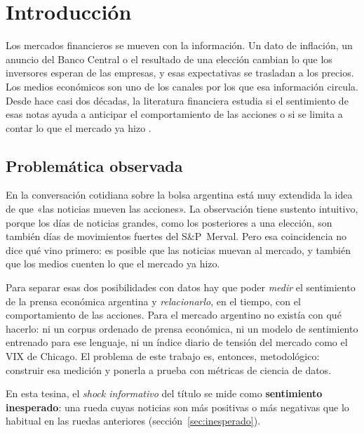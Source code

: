 \chapter{Introducción}
\label{cap:introduccion}

Los mercados financieros se mueven con la información. Un dato de inflación, un anuncio del
Banco Central o el resultado de una elección cambian lo que los inversores esperan de las
empresas, y esas expectativas se trasladan a los precios. Los medios económicos son uno de los
canales por los que esa información circula. Desde hace casi dos décadas, la literatura
financiera estudia si el sentimiento de esas notas ayuda a anticipar el comportamiento de las
acciones o si se limita a contar lo que el mercado ya hizo \citep{tetlock2007,garcia2013,verma2026}.

\section{Problemática observada}

En la conversación cotidiana sobre la bolsa argentina está muy extendida la idea de que «las
noticias mueven las acciones». La observación tiene sustento intuitivo, porque los días de
noticias grandes, como los posteriores a una elección, son también días de movimientos fuertes
del S\&P~Merval. Pero esa coincidencia no dice qué vino primero: es posible que las noticias
muevan al mercado, y también que los medios cuenten lo que el mercado ya hizo.

Para separar esas dos posibilidades con datos hay que poder \textit{medir} el sentimiento de la
prensa económica argentina y \textit{relacionarlo}, en el tiempo, con el comportamiento de las
acciones. Para el mercado argentino no existía con qué hacerlo: ni un corpus ordenado de prensa
económica, ni un modelo de sentimiento entrenado para ese lenguaje, ni un índice diario de
tensión del mercado como el VIX de Chicago. El problema de este trabajo es, entonces,
metodológico: construir esa medición y ponerla a prueba con métricas de ciencia de datos.

En esta tesina, el \textit{shock informativo} del título se mide como \textbf{sentimiento
inesperado}: una rueda cuyas noticias son más positivas o más negativas que lo habitual en las
ruedas anteriores (sección~\ref{sec:inesperado}).

